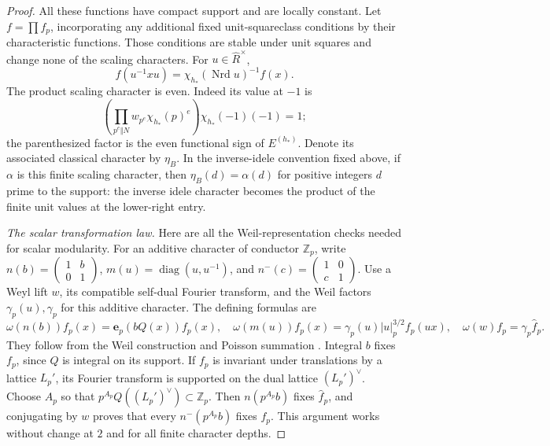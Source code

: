 \begin{proof}
All these functions have compact support and are locally constant.
Let $f=\prod f_p$, incorporating any additional fixed unit-squareclass
conditions by their characteristic functions.  Those conditions are
stable under unit squares and change none of the scaling characters.
For $u\in\widehat R^\times$,
\begin{equation}\label{co:order-equivariance}
 f(u^{-1}xu)=\chi_{h_*}(\operatorname{Nrd}u)^{-1}f(x).
\end{equation}
The product scaling character is even.  Indeed its value at $-1$ is
\[
 \left(\prod_{p^e\Vert N}w_{p^e}\chi_{h_*}(p)^e\right)
       \chi_{h_*}(-1)(-1)=1;
\]
the parenthesized factor is the even functional sign of $E^{(h_*)}$.
Denote its associated classical character by $\eta_B$.  In the
inverse-idele convention fixed above, if $\alpha$ is this finite
scaling character, then $\eta_B(d)=\alpha(d)$ for positive integers
$d$ prime to the support: the inverse idele character becomes the
product of the finite unit values at the lower-right entry.

\par\smallskip\noindent\emph{The scalar transformation law.}
Here are all the Weil-representation checks needed for scalar
modularity.  For an additive character of conductor $\mathbb Z_p$,
write $n(b)=\left(\begin{smallmatrix}1&b\\0&1\end{smallmatrix}\right)$,
$m(u)=\operatorname{diag}(u,u^{-1})$, and
$n^-(c)=\left(\begin{smallmatrix}1&0\\c&1\end{smallmatrix}\right)$.
Use a Weyl lift $w$, its compatible self-dual Fourier transform, and
the Weil factors $\gamma_p(u),\gamma_p$ for this additive character.
The defining formulas are
\[
 \omega(n(b))f_p(x)=\mathbf e_p(bQ(x))f_p(x),\quad
 \omega(m(u))f_p(x)=\gamma_p(u)|u|_p^{3/2}f_p(ux),\quad
 \omega(w)f_p=\gamma_p\widehat f_p.
\]
They follow from the Weil construction and Poisson summation
\cite[I, no.~13]{Weil1964}.  Integral $b$ fixes $f_p$, since $Q$ is integral on
its support.  If $f_p$ is invariant under translations by a lattice
$L_p'$, its Fourier transform is supported on the dual lattice
$(L_p')^\vee$.  Choose $A_p$ so that
$p^{A_p}Q((L_p')^\vee)\subset\mathbb Z_p$.  Then $n(p^{A_p}b)$ fixes
$\widehat f_p$, and conjugating by $w$ proves that every
$n^-(p^{A_p}b)$ fixes $f_p$.  This argument works without change at
$2$ and for all finite character depths.


\end{proof}
